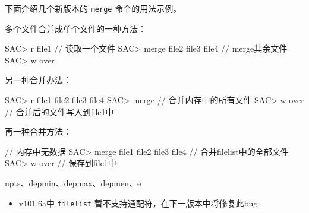 下面介绍几个新版本的 \texttt{merge} 命令的用法示例。

多个文件合并成单个文件的一种方法：
\begin{SACCode}
SAC> r file1                        // 读取一个文件
SAC> merge file2 file3 file4        // merge其余文件
SAC> w over
\end{SACCode}

另一种合并办法：
\begin{SACCode}
SAC> r file1 file2 file3 file4
SAC> merge                      // 合并内存中的所有文件
SAC> w over                     // 合并后的文件写入到file1中
\end{SACCode}

再一种合并方法：
\begin{SACCode}
                                    // 内存中无数据
SAC> merge file1 file2 file3 file4  // 合并filelist中的全部文件
SAC> w over                         // 保存到file1中
\end{SACCode}

npts、depmin、depmax、depmen、e

\begin{itemize}
\item v101.6a中 \texttt{filelist} 暂不支持通配符，在下一版本中将修复此bug
\end{itemize}
